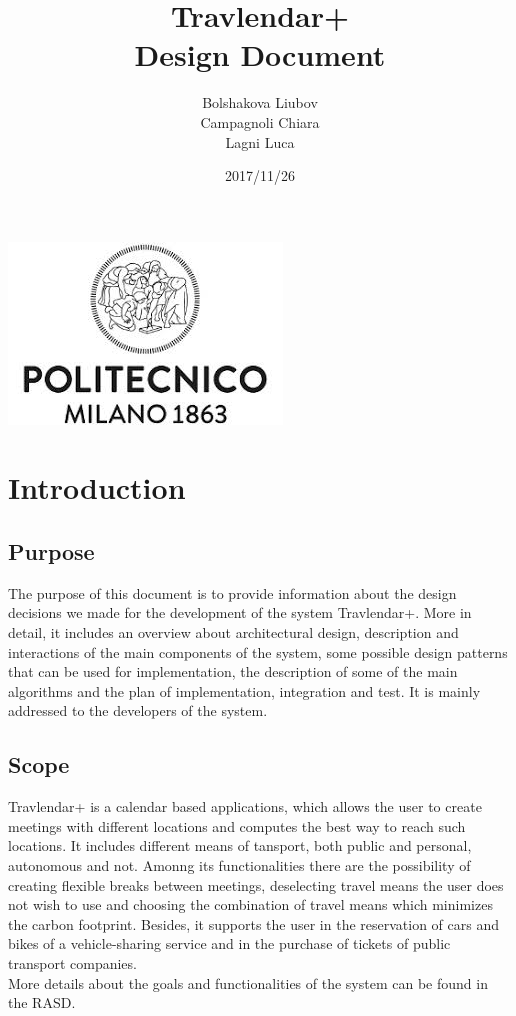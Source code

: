 \documentclass[a4paper,leqno]{article}
\begin{document}
	
	
	\date{2017/11/26}
	\author{Bolshakova Liubov\\ Campagnoli Chiara\\ Lagni Luca}
	\title{\textbf{\huge Travlendar+}\\ Design Document}
	\begin{minipage}[!t]{\linewidth}
		\centering
		\includegraphics[scale=0.8]{logo2}
	\end{minipage}
	\begin{minipage}[!h]{\linewidth}
		\maketitle 
	\end{minipage}
	
	\newpage
	\tableofcontents                        
  
\newpage	
\section{Introduction}

\subsection{Purpose}
The purpose of this document is to provide information about the design decisions we made for the development of the system Travlendar+. More in detail, it includes an overview about architectural design, description and interactions of the main components of the system, some possible design patterns that can be used for implementation, the description of some of the main algorithms and the plan of implementation, integration and test. It is mainly addressed to the developers of the system.

\subsection{Scope}
Travlendar+ is a calendar based applications, which allows the user to create meetings with different locations and computes the best way to reach such locations. It includes different means of tansport, both public and personal, autonomous and not. Amonng its functionalities there are the possibility of creating flexible breaks between meetings, deselecting travel means the user does not wish to use and choosing the combination of travel means which minimizes the carbon footprint. Besides, it supports the user in the reservation of cars and bikes of a vehicle-sharing service and in the purchase of tickets of public transport companies.\\
More details about the goals and functionalities of the system can be found in the RASD.
\end{document}
